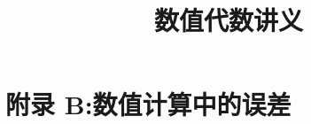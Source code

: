 \documentclass{book}
\begin{document}
\title{数值代数讲义}
\maketitle

\chapter{附录 B:数值计算中的误差}

\cite{stein2003}


\end{document}
